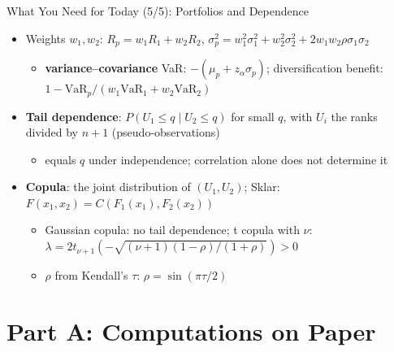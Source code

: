 \begin{frame}{What You Need for Today (5/5): Portfolios and Dependence}
\itemsize{\small}
\begin{itemize}
    \item Weights $w_1, w_2$: $R_p = w_1R_1 + w_2R_2$, $\sigma_p^2 = w_1^2\sigma_1^2 + w_2^2\sigma_2^2 + 2w_1w_2\rho\sigma_1\sigma_2$
    \begin{itemize}
        \item \textbf{variance--covariance} VaR: $-(\mu_p + z_\alpha\sigma_p)$; diversification benefit: $1 - \mathrm{VaR}_p/(w_1\mathrm{VaR}_1 + w_2\mathrm{VaR}_2)$
    \end{itemize}
    \item \textbf{Tail dependence}: $P(U_1 \le q \mid U_2 \le q)$ for small $q$, with $U_i$ the ranks divided by $n + 1$ (pseudo-observations)
    \begin{itemize}
        \item equals $q$ under independence; correlation alone does not determine it
    \end{itemize}
    \item \textbf{Copula}: the joint distribution of $(U_1, U_2)$; Sklar: $F(x_1, x_2) = C(F_1(x_1), F_2(x_2))$
    \begin{itemize}
        \item Gaussian copula: no tail dependence; t copula with $\nu$: $\lambda = 2t_{\nu+1}(-\sqrt{(\nu + 1)(1 - \rho)/(1 + \rho)}) > 0$ 
        \item $\rho$ from Kendall's $\tau$: $\rho = \sin(\pi\tau/2)$
    \end{itemize}
\end{itemize}
\end{frame}


\section{Part A: Computations on Paper}

